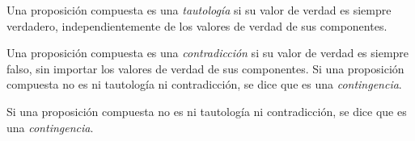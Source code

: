 \documentclass[a4,11pt]{aleph-notas}
\begin{document}
\begin{defi}[Tautología]
    Una proposición compuesta es una \emph{tautología} si su valor de verdad es siempre verdadero, independientemente de los valores de verdad de sus componentes.
\end{defi}

\begin{defi}[Contradicción]
    Una proposición compuesta es una \emph{contradicción} si su valor de verdad es siempre falso, sin importar los valores de verdad de sus componentes. Si una proposición compuesta no es ni tautología ni contradicción, se dice que es una \emph{contingencia}.
\end{defi}

\begin{defi}[Contingencia]
    Si una proposición compuesta no es ni tautología ni contradicción, se dice que es una \emph{contingencia}.
\end{defi}
\end{document}
